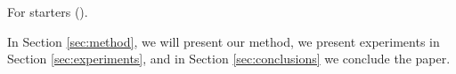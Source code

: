 For starters (\citet{krizhevsky2012imagenet}).

In Section \ref{sec:method}, we will present our method, we present experiments in Section \ref{sec:experiments}, and in Section \ref{sec:conclusions} we conclude the paper.